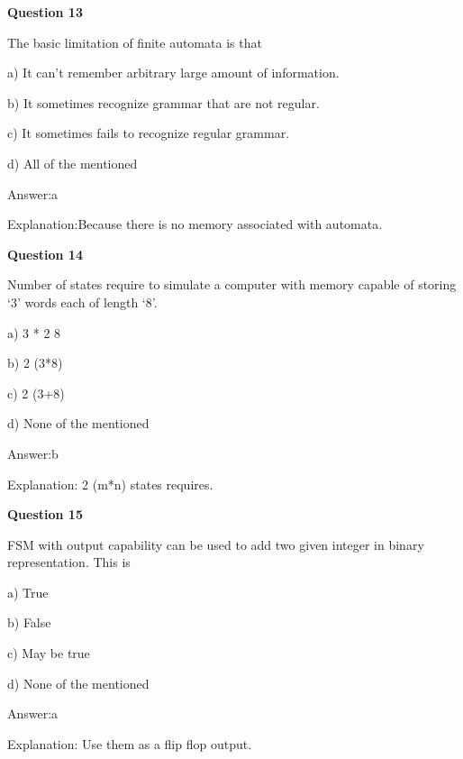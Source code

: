 \documentclass{article}
\begin{document}
\begin{mdframed}[linewidth=1pt, roundcorner=5pt, linecolor=gray!30, backgroundcolor=gray!5]
\textbf{Question 13} 

The basic limitation of finite automata is that

a) It can't remember arbitrary large amount of information.

b) It sometimes recognize grammar that are not regular.

c) It sometimes fails to recognize regular grammar.

d) All of the mentioned
\vspace{5pt} \par
\begin{tcolorbox}[colback=green!5, colframe=green!40!black, title=Solution]
Answer:a

Explanation:Because there is no memory associated with automata.
\end{tcolorbox}
\end{mdframed}

\begin{mdframed}[linewidth=1pt, roundcorner=5pt, linecolor=gray!30, backgroundcolor=gray!5]
\textbf{Question 14} 

Number of states require to simulate a computer with memory capable of storing ‘3' words each of length ‘8'.

a) 3 * 2
8

b) 2
(3*8)

c) 2
(3+8)

d) None of the mentioned
\vspace{5pt} \par
\begin{tcolorbox}[colback=green!5, colframe=green!40!black, title=Solution]
Answer:b

Explanation: 2
(m*n)
 states requires.
\end{tcolorbox}
\end{mdframed}

\begin{mdframed}[linewidth=1pt, roundcorner=5pt, linecolor=gray!30, backgroundcolor=gray!5]
\textbf{Question 15} 

FSM with output capability can be used to add two given integer in binary representation. This is

a) True

b) False

c) May be true

d) None of the mentioned
\vspace{5pt} \par
\begin{tcolorbox}[colback=green!5, colframe=green!40!black, title=Solution]
Answer:a

Explanation: Use them as a flip flop output.
\end{tcolorbox}
\end{mdframed}
\newpage
\end{document}
